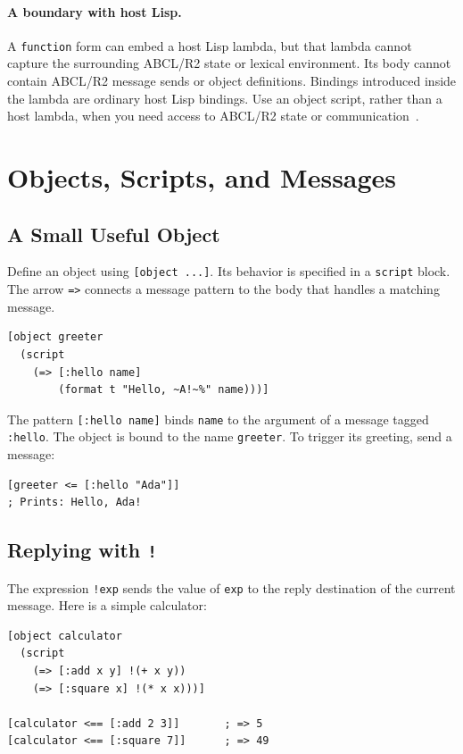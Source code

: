 \documentclass[11pt,a4paper]{article}
\newcommand{\code}[1]{\texttt{#1}}
\begin{document}
\paragraph{A boundary with host Lisp.}
A \code{function} form can embed a host Lisp lambda, but that lambda
cannot capture the surrounding ABCL/R2 state or lexical environment.
Its body cannot contain ABCL/R2 message sends or object definitions.
Bindings introduced inside the lambda are ordinary host Lisp bindings.
Use an object script, rather than a host lambda, when you need access
to ABCL/R2 state or communication~\cite{guide}.

\section{Objects, Scripts, and Messages}
\label{sec:objects}

\subsection{A Small Useful Object}

Define an object using \code{[object ...]}. Its behavior is specified in
a \code{script} block. The arrow \code{=>} connects a message pattern
to the body that handles a matching message.

\begin{lstlisting}
[object greeter
  (script
    (=> [:hello name]
        (format t "Hello, ~A!~%" name)))]
\end{lstlisting}

The pattern \code{[:hello name]} binds \code{name} to the argument of
a message tagged \code{:hello}. The object is bound to the name
\code{greeter}. To trigger its greeting, send a message:

\begin{lstlisting}
[greeter <= [:hello "Ada"]]
; Prints: Hello, Ada!
\end{lstlisting}

\subsection{Replying with \code{!}}

The expression \code{!exp} sends the value of \code{exp} to the reply
destination of the current message. Here is a simple calculator:

\begin{lstlisting}
[object calculator
  (script
    (=> [:add x y] !(+ x y))
    (=> [:square x] !(* x x)))]

[calculator <== [:add 2 3]]       ; => 5
[calculator <== [:square 7]]      ; => 49
\end{lstlisting}
\end{document}
